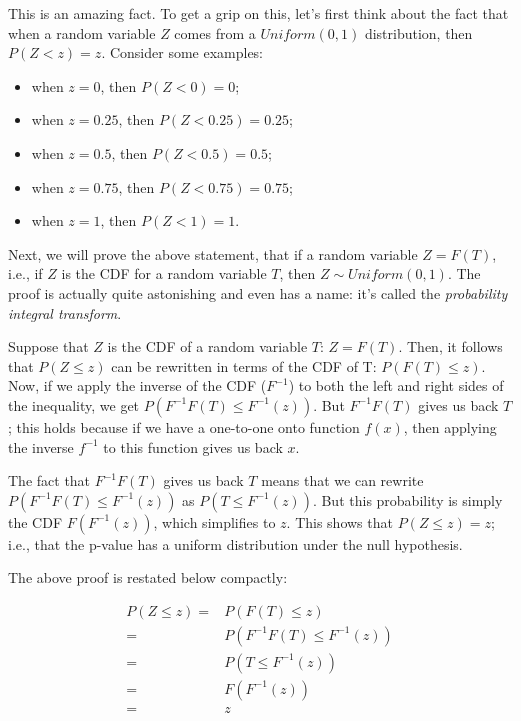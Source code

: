 \documentclass[12pt,]{krantz}
\providecommand{\tightlist}{%
  \setlength{\itemsep}{0pt}\setlength{\parskip}{0pt}}
\begin{document}
This is an amazing fact. To get a grip on this, let's first think about the fact that when a random variable \(Z\) comes from a \(Uniform(0,1)\) distribution, then \(P(Z<z)=z\). Consider some examples:

\begin{itemize}
\tightlist
\item
  when \(z=0\), then \(P(Z<0)=0\);
\item
  when \(z=0.25\), then \(P(Z<0.25)=0.25\);
\item
  when \(z=0.5\), then \(P(Z<0.5)=0.5\);
\item
  when \(z=0.75\), then \(P(Z<0.75)=0.75\);
\item
  when \(z=1\), then \(P(Z<1)=1\).
\end{itemize}

Next, we will prove the above statement, that if a random variable \(Z=F(T)\), i.e., if \(Z\) is the
CDF for a random variable \(T\), then \(Z \sim Uniform(0,1)\).
The proof is actually quite astonishing and even has a name: it's called the \emph{probability integral transform}.

Suppose that \(Z\) is the CDF of a random variable \(T\): \(Z=F(T)\). Then, it follows that \(P(Z\leq z)\) can be rewritten in terms of the CDF of T: \(P(F(T)\leq z)\). Now, if we apply the inverse of the CDF (\(F^{-1}\)) to both the left and right sides of the inequality, we get \(P(F^{-1}F(T)\leq F^{-1}(z))\).
But \(F^{-1}F(T)\) gives us back \(T\); this holds because if we have a one-to-one onto function \(f(x)\), then applying the inverse \(f^{-1}\) to this function gives us back \(x\).

The fact that \(F^{-1}F(T)\) gives us back \(T\) means that we can rewrite \(P(F^{-1}F(T)\leq F^{-1}(z))\) as \(P(T\leq F^{-1}(z) )\). But this probability is simply the CDF \(F(F^{-1} (z))\), which simplifies to \(z\). This shows that \(P(Z\leq z) = z\); i.e., that the p-value has a uniform distribution under the null hypothesis.

The above proof is restated below compactly:

\begin{equation}
\begin{split}
P(Z\leq z) =& P(F(T)\leq z)\\
=& P(F^{-1}F(T)\leq F^{-1}(z))\\
=& P(T\leq F^{-1}(z) ) \\
=& F(F^{-1} (z))\\
=& z\\
\end{split}
\end{equation}
\end{document}
